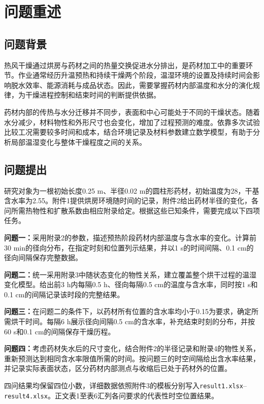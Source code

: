 \section{问题重述}
\subsection{问题背景}
热风干燥通过烘房与药材之间的热量交换促进水分排出，是药材加工中的重要环节。作业通常经历升温预热和持续干燥两个阶段，温湿环境的设置及持续时间会影响脱水效率、能源消耗与成品状态。因此，需要掌握药材内部温度和水分的演化规律，为干燥进程控制和结束时间的判断提供依据。

药材内部的传热与水分迁移并不同步，表面和中心可能处于不同的干燥状态。随着水分减少，材料物性和外形尺寸也会变化，增加了过程预测的难度。依靠多次试验比较工况需要较多时间和成本，结合环境记录及材料参数建立数学模型，有助于分析局部温湿变化与整体干燥程度之间的关系。

\subsection{问题提出}
研究对象为一根初始长度0.25 m、半径0.02 m的圆柱形药材，初始温度为28\tempunit，干基含水率为2.55\cunit。附件1提供烘房环境随时间的记录，附件2给出药材半径的变化，各问所需热物性和扩散系数由相应附录给定。根据这些已知条件，需要完成以下四项任务。

\textbf{问题一：}采用附录2的参数，描述预热阶段药材内部温度与含水率的变化。计算前30 min的径向分布，在指定时刻和位置列示结果，并以1 s的时间间隔、0.1 cm的径向间隔保存完整数据。

\textbf{问题二：}统一采用附录3中随状态变化的物性关系，建立覆盖整个烘干过程的温湿变化模型。给出前3 h内每隔0.5 h、径向每隔0.5 cm的温度与含水率，同时按1 s和0.1 cm的间隔记录该时段的完整结果。

\textbf{问题三：}在问题二的条件下，以药材所有位置的含水率均小于0.15\cunit 为要求，确定所需烘干时间。每隔6 h展示径向间隔0.5 cm的含水率，补充结束时刻的分布，并按60 s和0.1 cm的间隔保存干燥历程。

\textbf{问题四：}考虑药材失水后的尺寸变化，结合附件2的半径记录和附录4的物性关系，重新预测达到相同含水率限值所需的时间。按问题三的时空间隔给出含水率结果，并记录实际表面状态，区分药材内部测点与收缩后已处于药材外的位置。

四问结果均保留四位小数，详细数据依照附件3的模板分别写入\texttt{result1.xlsx}--\texttt{result4.xlsx}。正文表1至表6汇列各问要求的代表性时空位置结果。

\newpage
